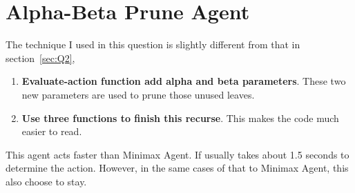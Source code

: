 \documentclass{article}
\begin{document}
	\section{Alpha-Beta Prune Agent}
	\label{sec:Q3}
	The technique I used in this question is slightly different from that in section~\ref{sec:Q2},
	\begin{enumerate}
		\item \textbf{Evaluate-action function add alpha and beta parameters}. These two new parameters are used to prune those unused leaves.
		\item \textbf{Use three functions to finish this recurse}. This makes the code much easier to read.
	\end{enumerate}
	This agent acts faster than Minimax Agent. If usually takes about 1.5 seconds to determine the action. However, in the same cases of that to Minimax Agent, this also choose to stay.
\end{document}
